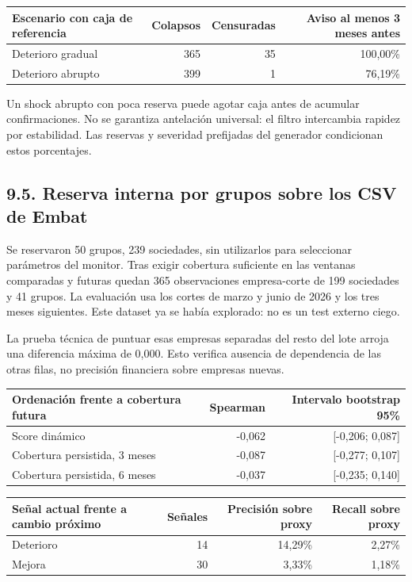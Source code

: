 \begin{center}
\small
\begin{tabular}{lrrr}
\hline
Escenario con caja de referencia & Colapsos & Censuradas & Aviso al menos 3 meses antes \\
\hline
Deterioro gradual & 365 & 35 & 100,00\% \\
Deterioro abrupto & 399 & 1 & 76,19\% \\
\hline
\end{tabular}
\end{center}

Un shock abrupto con poca reserva puede agotar caja antes de acumular confirmaciones. No se garantiza antelación universal: el filtro intercambia rapidez por estabilidad. Las reservas y severidad prefijadas del generador condicionan estos porcentajes.

\subsection*{9.5. Reserva interna por grupos sobre los CSV de Embat}

Se reservaron 50 grupos, 239 sociedades, sin utilizarlos para seleccionar parámetros del monitor. Tras exigir cobertura suficiente en las ventanas comparadas y futuras quedan 365 observaciones empresa-corte de 199 sociedades y 41 grupos. La evaluación usa los cortes de marzo y junio de 2026 y los tres meses siguientes. Este dataset ya se había explorado: no es un test externo ciego.

La prueba técnica de puntuar esas empresas separadas del resto del lote arroja una diferencia máxima de 0,000. Esto verifica ausencia de dependencia de las otras filas, no precisión financiera sobre empresas nuevas.

\begin{center}
\small
\begin{tabular}{lrr}
\hline
Ordenación frente a cobertura futura & Spearman & Intervalo bootstrap 95\% \\
\hline
Score dinámico & -0,062 & [-0,206; 0,087] \\
Cobertura persistida, 3 meses & -0,087 & [-0,277; 0,107] \\
Cobertura persistida, 6 meses & -0,037 & [-0,235; 0,140] \\
\hline
\end{tabular}
\end{center}

\begin{center}
\small
\begin{tabular}{lrrr}
\hline
Señal actual frente a cambio próximo & Señales & Precisión sobre proxy & Recall sobre proxy \\
\hline
Deterioro & 14 & 14,29\% & 2,27\% \\
Mejora & 30 & 3,33\% & 1,18\% \\
\hline
\end{tabular}
\end{center}

